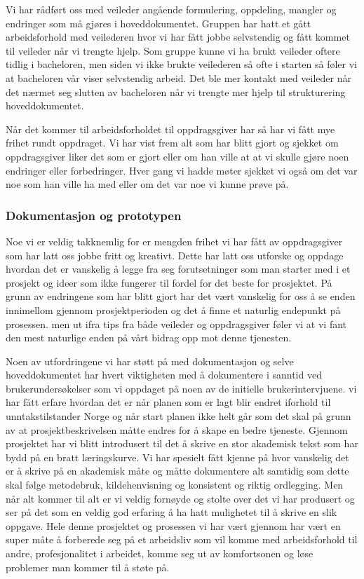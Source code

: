 Vi har rådført oss med veileder angående formulering, oppdeling, mangler og endringer som må gjøres i hoveddokumentet. Gruppen har hatt et gått arbeidsforhold med veilederen hvor vi har fått jobbe selvstendig og fått kommet til veileder når vi trengte hjelp. Som gruppe kunne vi ha brukt veileder oftere tidlig i bacheloren, men siden vi ikke brukte veilederen så ofte i starten så føler vi at bacheloren vår viser selvstendig arbeid. Det ble mer kontakt med veileder når det nærmet seg slutten av bacheloren når vi trengte mer hjelp til strukturering hoveddokumentet. 

Når det kommer til arbeidsforholdet til oppdragsgiver har så har vi fått mye frihet rundt oppdraget. Vi har vist frem alt som har blitt gjort og sjekket om oppdragsgiver liker det som er gjort eller om han ville at at vi skulle gjøre noen endringer eller forbedringer. Hver gang vi hadde møter sjekket vi også om det var noe som han ville ha med eller om det var noe vi kunne prøve på. 

\subsubsection{Dokumentasjon og prototypen}

Noe vi er veldig takknemlig for er mengden frihet vi har fått av oppdragsgiver som har latt oss jobbe fritt og kreativt. Dette har latt oss utforske og oppdage hvordan det er vanskelig å legge fra seg forutsetninger som man starter med i et prosjekt og ideer som ikke fungerer til fordel for det beste for prosjektet. På grunn av endringene som har blitt gjort har det vært vanskelig for oss å se enden innimellom gjennom prosjektperioden og det å finne et naturlig endepunkt på prosessen. men ut ifra tips fra både veileder og oppdragsgiver føler vi at vi fant den mest naturlige enden på vårt bidrag opp mot denne tjenesten.

Noen av utfordringene vi har støtt på med dokumentasjon og selve hoveddokumentet har hvert viktigheten med å dokumentere i sanntid ved brukerundersøkelser som vi oppdaget på noen av de initielle brukerintervjuene. vi har fått erfare hvordan det er når planen som er lagt blir endret iforhold til unntakstilstander Norge og når start planen ikke helt går som det skal på grunn av at prosjektbeskrivelsen måtte endres for å skape en bedre tjeneste. Gjennom prosjektet har vi blitt introdusert til det å skrive en stor akademisk tekst som har bydd på en bratt læringskurve. Vi har spesielt fått kjenne på hvor vanskelig det er å skrive på en akademisk måte og måtte dokumentere alt samtidig som dette skal følge metodebruk, kildehenvisning og konsistent og riktig ordlegging. Men når alt kommer til alt er vi veldig fornøyde og stolte over det vi har produsert og ser på det som en veldig god erfaring å ha hatt mulighetet til å skrive en slik oppgave. Hele denne prosjektet og prosessen vi har vært gjennom har vært en super måte å forberede seg på et arbeidsliv som vil komme med arbeidsforhold til andre, profesjonalitet i arbeidet, komme seg ut av komfortsonen og løse problemer man kommer til å støte på.


